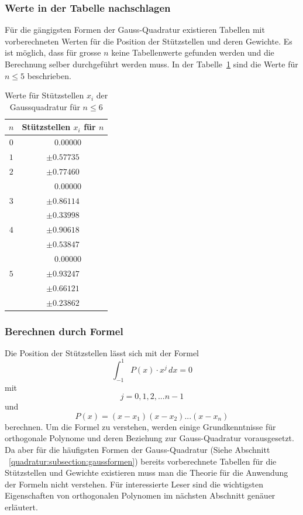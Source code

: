 \subsubsection{Werte in der Tabelle nachschlagen}
Für die gängigsten Formen der Gauss-Quadratur existieren Tabellen mit vorberechneten Werten für die
Position der Stützstellen und deren Gewichte. 
Es ist möglich, dass für grosse $n$ keine Tabellenwerte gefunden werden und die Berechnung 
selber durchgeführt werden muss.
In der Tabelle~\ref{buch:table:gaussabscissenwerte} sind die Werte für $n \leq 5$ beschrieben.
\begin{table}
    \centering
    \begin{tabular}{|c|c|}
        \hline
        $n$ & Stützstellen $x_{i}$ für $n$ \\
        \hline
        $0$ & $ \phantom{-} 0.00000 $ \\
        \hline
        $1$ & $ \pm 0.57735 $ \\
        \hline
        $2$ & $ \pm 0.77460 $ \\
            & $ \phantom{-} 0.00000 $ \\
        \hline
        $3$ & $ \pm 0.86114 $ \\
            & $ \pm 0.33998 $ \\
        \hline
        $4$ & $ \pm 0.90618 $ \\
            & $ \pm 0.53847 $ \\
            & $ \phantom{-} 0.00000 $ \\
        \hline
        $5$ & $ \pm 0.93247 $ \\
            & $ \pm 0.66121 $ \\
            & $ \pm 0.23862 $ \\
        \hline
    \end{tabular}
    \caption{Werte für Stützstellen $x_{i}$ der Gaussquadratur für $n \leq 6$
    \label{buch:table:gaussabscissenwerte}}    
\end{table}

\subsubsection{Berechnen durch Formel}
Die Position der Stützstellen lässt sich mit der Formel
\begin{equation*}
    \int_{-1}^{1} P(x) \cdot x^{j} \, dx = 0
\end{equation*}
mit
\begin{equation*}
    j = 0, 1, 2, ... n - 1
\end{equation*}
und 
\begin{equation}
    P(x) = (x - x_{1})(x - x_{2}) ... (x - x_{n})
\end{equation}
berechnen. Um die Formel zu verstehen, werden einige Grundkenntnisse für 
orthogonale Polynome und deren Beziehung zur Gauss-Quadratur vorausgesetzt.
Da aber für die häufigsten Formen der Gauss-Quadratur 
(Siehe Abschnitt ~\ref{quadratur:subsection:gaussformen}) bereits vorberechnete
Tabellen für die Stützstellen und Gewichte existieren muss man die Theorie
für die Anwendung der Formeln nicht verstehen. Für interessierte Leser sind 
die wichtigsten Eigenschaften von orthogonalen Polynomen im nächsten 
Abschnitt genäuer erläutert.

